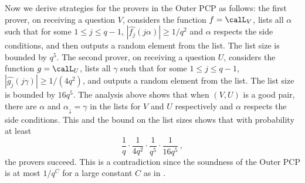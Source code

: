 %
Now we derive strategies for the provers in the Outer PCP as follows: the first prover,
on receiving a question $V$, considers the function $f = \calL_V$,
lists all $\alpha$ such that for some $1 \leq j \leq q-1$, $|\widehat{f_j}(j\alpha)| \geq {1}/{q^2}$ and $\alpha$ respects the side conditions, and
then outputs a random element from the list. The list size is bounded by $q^5$.
The second prover, on receiving a question $U$, considers the function
$g = \calL_U$,
lists all $\gamma$
such that for some $1 \leq j \leq q-1$, $|\widehat{g_j}(j\gamma)| \geq {1}/{(4q^2)}$, and
outputs a random element from the list. The list size is bounded by $16q^5$.
The analysis above shows that when $(V,U)$ is a good pair, there are $\alpha$
and $\alpha_\downarrow = \gamma$ in the lists for $V$ and $U$ respectively and $\alpha$
respects the side conditions. This and the bound on the list sizes
shows that with probability at least 
\[
\frac{1}{q}\cdot \frac{1}{4q^2} \cdot\frac{1}{q^5}
\cdot \frac{1}{16q^5}\,,
\]
the provers succeed. This is a contradiction since the
soundness of the Outer PCP is at most ${1}/{q^C}$ for a large constant $C$ as in
.
